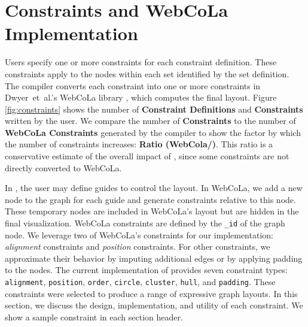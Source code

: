 \section{\projectname Constraints and WebCoLa Implementation}
\label{sec:constraints}
Users specify one or more constraints for each constraint definition.
These constraints apply to the nodes within each set identified by the set definition.
The \projectname compiler converts each \projectname constraint into one or more
constraints in Dwyer~et~al.'s WebCoLa library \cite{WebCoLa}, which computes
the final layout. Figure \ref{fig:constraints} shows the number
of \textbf{Constraint Definitions} and \textbf{\projectname Constraints} written
by the user. We compare the number of \textbf{\projectname Constraints} to
the number of \textbf{WebCoLa Constraints} generated by the \projectname compiler
to show the factor by which the number of constraints increases: \textbf{Ratio
(WebCola/\projectname)}. This ratio is a conservative estimate of the
overall impact of \projectname, since some \projectname constraints are not
directly converted to WebCoLa.

In \projectname, the user may define guides to control the layout.
In WebCoLa, we add a new node to the graph for each guide and generate 
constraints relative to this node. These temporary nodes are included in 
WebCoLa's layout but are hidden in the final visualization.
WebCoLa constraints are defined by the \texttt{\_id} of the graph 
node. We leverage two of WebCoLa's constraints for our implementation: 
\emph{alignment} constraints and \emph{position} constraints. For other \projectname constraints, we
approximate their behavior by imputing additional edges or by applying
padding to the nodes. The current implementation of
\projectname provides seven constraint types:
\texttt{alignment}, \texttt{position}, \texttt{order}, \texttt{circle},
\texttt{cluster}, \texttt{hull}, and \texttt{padding}. These constraints
were selected to produce a range of expressive
graph layouts. In this section, we discuss the design, implementation, 
and utility of each \projectname constraint. We show 
a sample \projectname constraint in each section header.


